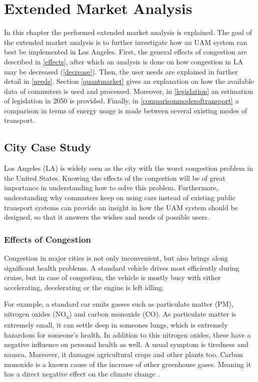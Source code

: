 \newpage

\chapter{Extended Market Analysis}
\label{ch-market}

In this chapter the performed extended market analysis is explained. The goal of the extended market analysis is to further investigate how an UAM system can best be implemented in Los Angeles. First, the general effects of congestion are described in \autoref{effects}, after which an analysis is done on how congestion in LA may be decreased (\autoref{decrease}). Then, the user needs are explained in further detail in \autoref{needs}. Section \ref{quantmarket} gives an explanation on how the available data of commuters is used and processed. Moreover, in \autoref{legislation} an estimation of legislation in 2050 is provided. Finally, in \autoref{comparisonmodesoftransport} a comparison in terms of energy usage is made between several existing modes of transport. 

\section{City Case Study}

Los Angeles (LA) is widely seen as the city with the worst congestion problem in the United States. Knowing the effects of the congestion will be of great importance in understanding how to solve this problem. Furthermore, understanding why commuters keep on using cars instead of existing public transport systems can provide an insight in how the UAM system should be designed, so that it answers the wishes and needs of possible users.

\subsection{Effects of Congestion}
\label{effects}
Congestion in major cities is not only inconvenient, but also brings along significant health problems. A standard vehicle drives most efficiently during cruise, but in case of congestion, the vehicle is mostly busy with either accelerating, decelerating or the engine is left idling. 

For example, a standard car emits gasses such as particulate matter (PM), nitrogen oxides (NO\textsubscript{x}) and carbon monoxide (CO). As particulate matter is extremely small, it can settle deep in someones lungs, which is extremely hazardous for someone's health. In addition to this nitrogen oxides, these have a negative influence on personal health as well. A usual symptom is tiredness and nausea. Moreover, it damages agricultural crops and other plants too. Carbon monoxide is a known cause of the increase of other greenhouse gases. Meaning it has a direct negative effect on the climate change \cite{cargasses}. 

